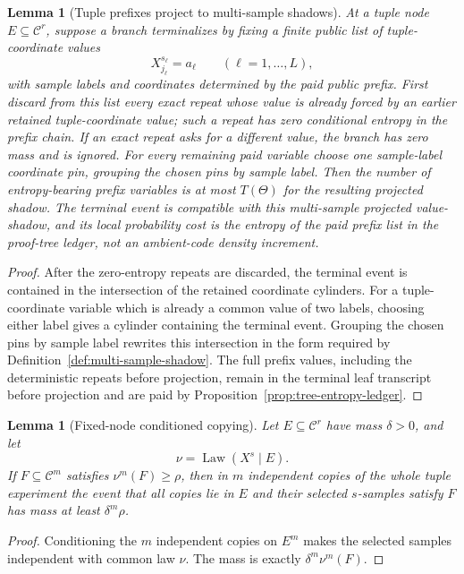 \documentclass[11pt]{article}
\newtheorem{lemma}[theorem]{Lemma}
\newcommand{\C}{\mathcal C}
\newcommand{\Law}{\operatorname{Law}}
\begin{document}
\begin{lemma}[Tuple prefixes project to multi-sample shadows]
\label{lem:tuple-prefix-shadow}
At a tuple node $E\subseteq\C^r$, suppose a branch terminalizes by fixing a
finite public list of tuple-coordinate values
\[
  X^{s_\ell}_{j_\ell}=a_\ell\qquad(\ell=1,\ldots,L),
\]
with sample labels and coordinates determined by the paid public prefix.  First
discard from this list every exact repeat whose value is already forced by an
earlier retained tuple-coordinate value; such a repeat has zero conditional
entropy in the prefix chain.  If an exact repeat asks for a different value, the
branch has zero mass and is ignored.  For every remaining paid variable choose
one sample-label coordinate pin, grouping the chosen pins by sample label.  Then
the number of entropy-bearing prefix variables is at most $T(\Theta)$ for the
resulting projected shadow.  The terminal event is compatible with this
multi-sample projected value-shadow, and its local probability cost is the
entropy of the paid prefix list in the proof-tree ledger, not an ambient-code
density increment.
\end{lemma}

\begin{proof}
After the zero-entropy repeats are discarded, the terminal event is contained
in the intersection of the retained coordinate cylinders.  For a
tuple-coordinate variable which is already a common value of two labels,
choosing either label gives a cylinder containing the terminal event.  Grouping
the chosen pins by sample label rewrites this intersection in the form required
by Definition~\ref{def:multi-sample-shadow}.  The full prefix values, including
the deterministic repeats before projection, remain in the terminal leaf
transcript before projection and are paid by
Proposition~\ref{prop:tree-entropy-ledger}.
\end{proof}

\begin{lemma}[Fixed-node conditioned copying]
\label{lem:fixed-copy}
Let $E\subseteq\C^r$ have mass $\delta>0$, and let
\[
  \nu=\Law(X^s\mid E).
\]
If $F\subseteq\C^m$ satisfies $\nu^m(F)\ge\rho$, then in $m$ independent
copies of the whole tuple experiment the event that all copies lie in $E$ and
their selected $s$-samples satisfy $F$ has mass at least $\delta^m\rho$.
\end{lemma}

\begin{proof}
Conditioning the $m$ independent copies on $E^m$ makes the selected samples
independent with common law $\nu$.  The mass is exactly
$\delta^m\nu^m(F)$.
\end{proof}
\end{document}
